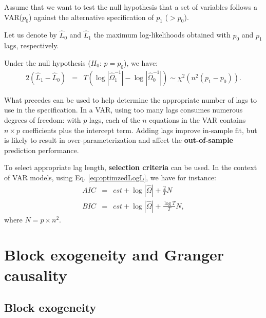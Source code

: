 \documentclass[
  12pt,
]{book}
\theoremstyle{definition}
\theoremstyle{definition}
\theoremstyle{definition}
\theoremstyle{definition}
\theoremstyle{remark}
\begin{document}
Assume that we want to test the null hypothesis that a set of variables follows a VAR(\(p_{0}\)) against the alternative
specification of \(p_{1}\) (\(>p_{0}\)).

Let us denote by \(\hat{L}_{0}\) and \(\hat{L}_{1}\) the maximum log-likelihoods obtained with \(p_{0}\) and \(p_{1}\) lags, respectively.

Under the null hypothesis (\(H_0\): \(p=p_0\)), we have:
\begin{eqnarray*}
2\left(\hat{L}_{1}-\hat{L}_{0}\right)&=&T\left(\log\left|\hat{\Omega}_{1}^{-1}\right|-\log\left|\hat{\Omega}_{0}^{-1}\right|\right)  \sim \chi^2(n^{2}(p_{1}-p_{0})).
\end{eqnarray*}

What precedes can be used to help determine the appropriate number of lags to use in the specification. In a VAR, using too many lags consumes numerous degrees of freedom: with \(p\) lags, each of the \(n\) equations in the VAR contains \(n\times p\) coefficients plus the intercept term. Adding lags improve in-sample fit, but is likely to result in over-parameterization and affect the \textbf{out-of-sample} prediction performance.

To select appropriate lag length, \textbf{selection criteria} can be used. In the context of VAR models, using Eq. \eqref{eq:optimzedLogL}, we have for instance:
\begin{eqnarray*}
AIC & = & cst + \log\left|\hat{\Omega}\right|+\frac{2}{T}N\\
BIC & = & cst + \log\left|\hat{\Omega}\right|+\frac{\log T}{T}N,
\end{eqnarray*}
where \(N=p \times n^{2}\).

\hypertarget{BlockGranger}{%
\section{Block exogeneity and Granger causality}\label{BlockGranger}}

\hypertarget{block-exogeneity}{%
\subsection{Block exogeneity}\label{block-exogeneity}}
\end{document}
